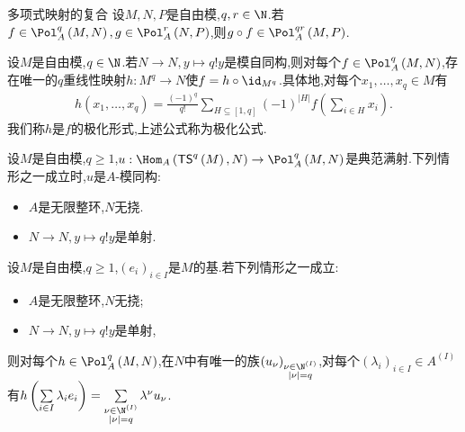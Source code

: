 \begin{proposition}{多项式映射的复合}{}
	设$M,N,P$是自由模,$q,r\in\N$.若$f\in\Pol_{A}^{q}\left(M,N\right),g\in\Pol_{A}^{r}\left(N,P\right)$,则$g\circ f\in\Pol_{A}^{qr}\left(M,P\right)$.
\end{proposition}

\begin{proposition}{}{}
	设$M$是自由模,$q\in\N$.若$N\to N,y\mapsto q!y$是模自同构,则对每个$f\in\Pol_{A}^{q}\left(M,N\right)$,存在唯一的$q$重线性映射$h:M^{q}\to N$使$f=h\circ\id_{M^{q}}$.具体地,对每个$x_{1},\ldots,x_{q}\in M$有
	\begin{align*}
		h\left(x_{1},\ldots,x_{q}\right)=\frac{\left(-1\right)^{q}}{q!}\sum\limits_{H\subseteq\left[1,q\right]}\left(-1\right)^{\left|H\right|}f\left(\sum\limits_{i\in H}x_{i}\right).
	\end{align*}
	我们称$h$是$f$的极化形式,上述公式称为极化公式.
\end{proposition}

\begin{proposition}{}{}
	设$M$是自由模,$q\geq 1$,$u:\Hom_{A}\left(\mathsf{TS}^{q}\left(M\right),N\right)\to\Pol_{A}^{q}\left(M,N\right)$是典范满射.下列情形之一成立时,$u$是$A$-模同构:
	\begin{itemize}
		\item $A$是无限整环,$N$无挠.
		\item $N\to N,y\mapsto q!y$是单射.
	\end{itemize}
\end{proposition}

\begin{corollary}{}{}
	设$M$是自由模,$q\geq 1$,$\left(e_{i}\right)_{i\in I}$是$M$的基.若下列情形之一成立:
	\begin{itemize}
		\item $A$是无限整环,$N$无挠;
		\item $N\to N,y\mapsto q!y$是单射,
	\end{itemize}
	则对每个$h\in\Pol_{A}^{q}\left(M,N\right)$,在$N$中有唯一的族$\left(u_{\nu}\right)_{\substack{\nu\in\N^{\left(I\right)}\\ \left|\nu\right|=q}}$,对每个$\left(\lambda_{i}\right)_{i\in I}\in A^{\left(I\right)}$有$h\left(\sum\limits_{i\in I}\lambda_{i}e_{i}\right)=\sum\limits_{\substack{\nu\in\N^{\left(I\right)}\\ \left|\nu\right|=q}}\lambda^{\nu}u_{\nu}$.
\end{corollary}
















